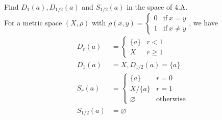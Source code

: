 \documentclass[document]{article}
\begin{document}
\begin{problem}[4.8] Find $D_1(a), D_{1/2}(a)$ and $S_{1/2}(a)$ in the space of 4.A.\\


For a metric space $\left(X,\rho\right)$ with $\rho(x,y) =  \begin{cases} 0 & \text{if} \ x=y \\ 1 & \text{if} \ x\neq y \end{cases}$, we have
\begin{align}
    D_r(a)&=\begin{cases} \{a\} & r < 1 \\ X & r \geq 1 \end{cases} \\
    D_1(a)&=X, D_{1/2}(a)=\{a\} \\
    S_r(a)&=\begin{cases} \{a\} & r=0 \\ X/\{a\} & r=1 \\ \varnothing & \text{otherwise} \end{cases} \\
    S_{1/2}(a) &= \varnothing
\end{align}
\end{problem}
\end{document}
